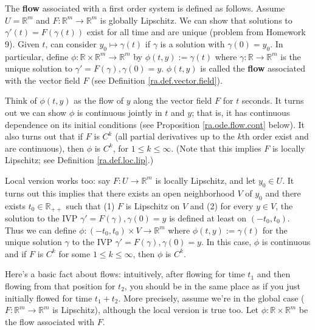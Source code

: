 \begin{definition}

The \textbf{flow} associated with a first order system is defined as follows. Assume \(U = \mathbb{R}^m\) and \(F: \mathbb{R}^m \to \mathbb{R}^m\) is globally Lipschitz. We can show that solutions to \(\gamma'(t) = F(\gamma(t))\) exist for all time and are unique (problem from Homework 9). Given \(t\), can consider \(y_0 \mapsto \gamma(t) \) if \(\gamma\) is a solution with \(\gamma(0) = y_0\). In particular, define \(\phi: \mathbb{R} \times \mathbb{R}^m \to \mathbb{R}^m\) by \(\phi(t, y) := \gamma(t)\) where \(\gamma: \mathbb{R} \to \mathbb{R}^m\) is the unique solution to \(\gamma' = F(\gamma), \gamma(0) = y\). \(\phi(t,y)\) is called the \textbf{flow} associated with the vector field \(F\) (see Definition \ref{ra.def.vector.field}).


\end{definition}

Think of \(\phi(t,y)\) as the flow of \(y\) along the vector field \(F\) for \(t\) seconds. It turns out we can show \(\phi\) is continuous jointly in \(t\) and \(y\); that is, it has continuous dependence on its initial conditions (see Proposition \ref{ra.ode.flow.cont} below). It also turns out that if \(F\) is \(C^k\) (all partial derivatives up to the \(k\)th order exist and are continuous), then \(\phi\) is \(C^k\), for \(1 \leq k \leq \infty\). (Note that this implies \(F\) is locally Lipschitz; see Definition \ref{ra.def.loc.lip}.)

Local version works too: say \(F: U \to \mathbb{R}^m\) is locally Lipschitz, and let \(y_0 \in U\). It turns out this implies that there exists an open neighborhood \(V\) of \(y_0\) and there exists \(t_0 \in \mathbb{R}_{++}\) such that (1) \(F\) is Lipschitz on \(V\) and (2) for every \(y \in V\), the solution to the IVP \(\gamma' = F(\gamma), \gamma(0) = y\) is defined at least on \((-t_0, t_0)\). Thus we can define \(\phi: (-t_0, t_0) \times V \to \mathbb{R}^m\) where \(\phi(t,y) := \gamma(t)\) for the unique solution \(\gamma\) to the IVP \(\gamma' = F(\gamma), \gamma(0) = y\). In this case, \(\phi\) is continuous and if \(F\) is \(C^k\) for some \(1 \leq k \leq \infty\), then \(\phi\) is \(C^k\).

Here's a basic fact about flows: intuitively, after flowing for time \(t_1\) and then flowing from that position for \(t_2\), you should be in the same place as if you just initially flowed for time \(t_1 + t_2\). More precisely, assume we're in the global case (\(F: \mathbb{R}^m \to \mathbb{R}^m\) is Lipschitz), although the local version is true too. Let \(\phi: \mathbb{R} \times \mathbb{R}^m\) be the flow associated with \(F\).

